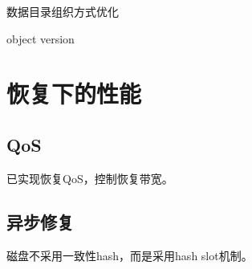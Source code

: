 \begin{enumbox}
\item 数据目录组织方式优化
\item object version
\end{enumbox}

\section{恢复下的性能}

\subsection{QoS}

已实现恢复QoS，控制恢复带宽。

\subsection{异步修复}

磁盘不采用一致性hash，而是采用hash slot机制。
